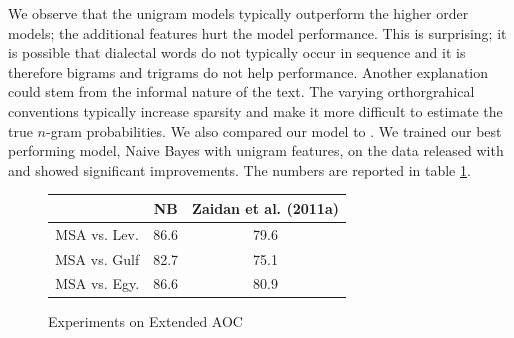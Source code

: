 \documentclass[10pt, a4paper]{article}
\begin{document}
We observe that the unigram models typically outperform the higher
order models; the additional features hurt the model performance. This is 
 surprising; it
is possible that dialectal words do not typically occur in sequence
and it is therefore bigrams and trigrams do not help
performance. Another explanation could stem from the informal nature
of the text. The varying orthorgrahical conventions typically increase
sparsity and make it more difficult to estimate the true $n$-gram
probabilities. We also compared our model to
. We trained our best performing model,
Naive Bayes with unigram features, on the data released with
 and showed significant improvements.
The numbers are reported in table \ref{tab:comparison}.
\begin{figure} \centering
\begin{tabular}{|c|c|c|} \hline & NB & Zaidan et al. (2011a) \\
\hline MSA vs. Lev. & 86.6 & 79.6 \\ \hline MSA vs. Gulf & 82.7 & 75.1
\\ \hline MSA vs. Egy. & 86.6 & 80.9 \\ \hline
\end{tabular}
\label{tab:comparison}
\caption{Experiments on Extended AOC}
\end{figure}
\end{document}
